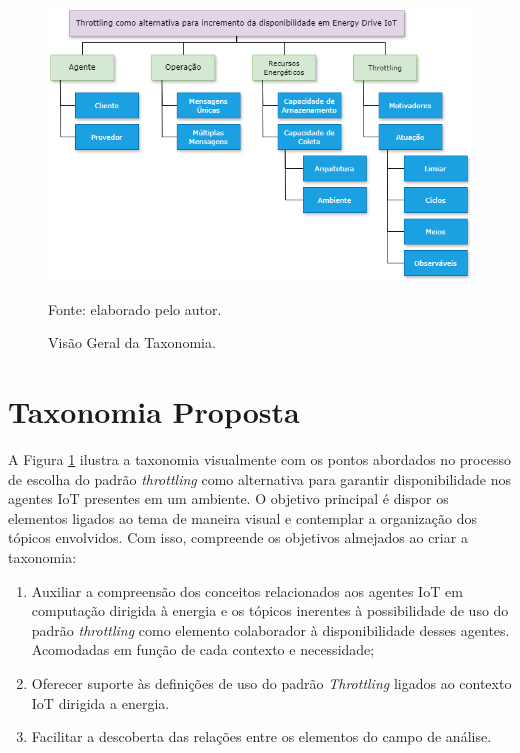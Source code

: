 \begin{figure}[hbt]
	\centering
	\caption{Visão Geral da Taxonomia.}
	\label{fig:visaogeraltaxonomia}
	\includegraphics[width=\textwidth]{Imagens/anexos/anexo_visaogeraltaxonomia.png}	
	
	Fonte: elaborado pelo autor.
\end{figure}

\section{Taxonomia Proposta}
A Figura \ref{fig:visaogeraltaxonomia} ilustra a taxonomia visualmente com os pontos abordados no processo de escolha do padrão \textit{throttling} como alternativa para garantir disponibilidade nos agentes \acs{IoT} presentes em um ambiente. O objetivo principal é dispor os elementos ligados ao tema de maneira visual e contemplar a organização dos tópicos envolvidos. Com isso, compreende os objetivos almejados ao criar a taxonomia:

\begin{enumerate}
    \item Auxiliar a compreensão dos conceitos relacionados aos agentes \acs{IoT} em computação dirigida à energia e os tópicos inerentes à possibilidade de uso do padrão \textit{throttling} como elemento colaborador à disponibilidade desses agentes. Acomodadas em função de cada contexto e necessidade;
  	\item Oferecer suporte às definições de uso do padrão \textit{Throttling} ligados ao contexto \acs{IoT} dirigida a energia. 
  	\item Facilitar a descoberta das relações entre os elementos do campo de análise.
\end{enumerate}

